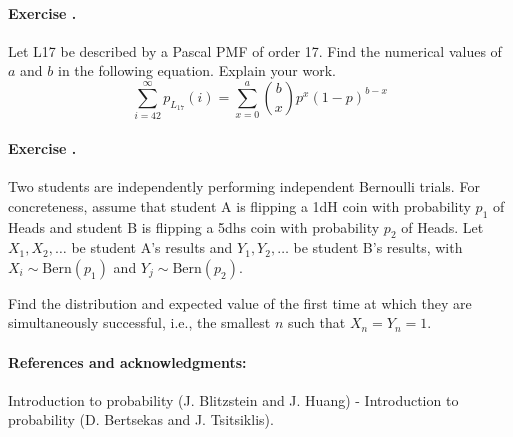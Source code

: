 \documentclass[twocolumn,12pt,a4paper]{article}
\newcounter{num}  %
\begin{document}
\paragraph{Exercise \thenum.}
Let L17 be described by a Pascal PMF of order 17. Find the numerical values of $a$ and $b$ in
the following equation. Explain your work.
$$
\sum_{i=42}^\infty p_{L_{17}}(i) = \sum_{x=0}^a \binom b x p^x (1-p)^{b-x}
$$


\paragraph{Exercise \thenum.}
Two students are independently performing independent Bernoulli trials. 
For concreteness, assume that student A is flipping a 1dH coin with probability $p_1$ of Heads and student B is flipping a 5dhs coin with probability $p_2$ of Heads. 
Let $X_1, X_2, \dots$ be student A's results and $Y_1, Y_2, \dots$ be student B's results, with $X_i \sim \text{Bern}(p_1)$ and $Y_j \sim \text{Bern}(p_2)$.

Find the distribution and expected value of the first time at which they are simultaneously successful, i.e., the smallest $n$ such that $X_n = Y_n = 1$.




\paragraph{References and acknowledgments:} Introduction to probability (J. Blitzstein and J. Huang) - Introduction to probability (D. Bertsekas and J.  Tsitsiklis).
\end{document}
